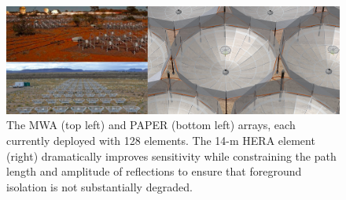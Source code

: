 \documentclass[preprint]{aastex}
\newcommand{\Caption}[4]{\vspace{#1}\renewcommand{\baselinestretch}{#2}\caption{#4}\vspace{#3}}
\begin{document}
\begin{figure}[t]\centering
\includegraphics[width=6.5in]{plots/PAPER_and_MWA_and_HERA.jpg}
\Caption{-0.25in}{0.99}{-0.15in}{\small
The MWA (top left) and PAPER (bottom left) arrays, each currently deployed with 128 elements.
The 14-m HERA element (right) dramatically improves sensitivity while 
constraining the path length and amplitude of reflections to ensure that foreground
isolation is not substantially degraded.
}
\label{fig:hera_dish}
\end{figure}
\end{document}

